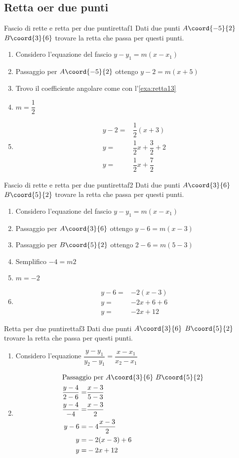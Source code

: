 \subsection{Retta oer due punti}
\begin{esempiot}{Fascio di rette e retta per due punti}{rettaf1}
Dati due punti $A\coord{-5}{2}$ $B\coord{3}{6}$ trovare la retta che passa per questi punti.
\end{esempiot}
\begin{enumerate}
	\item Considero l'equazione del fascio $y-y_1=m(x-x_1)$
	\item Passaggio per $A\coord{-5}{2}$ ottengo $y-2=m(x+5)$
	\item Trovo il coefficiente angolare come con l'\cref{exa:retta13}
	\item $m=\dfrac{1}{2}$
	\item \begin{align*}
		y-2=&\dfrac{1}{2}(x+3)\\
		y=&\dfrac{1}{2}x+\dfrac{3}{2}+2\\
		y=&\dfrac{1}{2}x+\dfrac{7}{2}
	\end{align*}
\end{enumerate}
\begin{esempiot}{Fascio di rette e retta per due punti}{rettaf2}
	Dati due punti $A\coord{3}{6}$ $B\coord{5}{2}$ trovare la retta che passa per questi punti.
\end{esempiot}
\begin{enumerate}
	\item Considero l'equazione del fascio $y-y_1=m(x-x_1)$
	\item Passaggio per $A\coord{3}{6}$ ottengo $y-6=m(x-3)$
	\item Passaggio per $B\coord{5}{2}$ ottengo $2-6=m(5-3)$
	\item Semplifico $-4=m2$
	\item $m=-2$
	\item \begin{align*}
		y-6=&-2(x-3)\\
		y=&-2x+6+6\\
		y=&-2x+12
	\end{align*}
\end{enumerate}
\begin{esempiot}{Retta per due punti}{rettaf3}
	Dati due punti $A\coord{3}{6}$ $B\coord{5}{2}$ trovare la retta che passa per questi punti.
\end{esempiot}
\begin{enumerate}
	\item Considero l'equazione  $\dfrac{y-y_1}{y_2-y_1}=\dfrac{x-x_1}{x_2-x_1}$
	\item \begin{align*}
		\intertext{Passaggio per $A\coord{3}{6}$ $B\coord{5}{2}$ }
	\dfrac{y-4}{2-6}=&\dfrac{x-3}{5-3}\\
	\dfrac{y-4}{-4}=&\dfrac{x-3}{2}\\
		y-6=&-4\dfrac{x-3}{2}\\
		y=&-2(x-3)+6\\
		y=&-2x+12
	\end{align*}
\end{enumerate}
